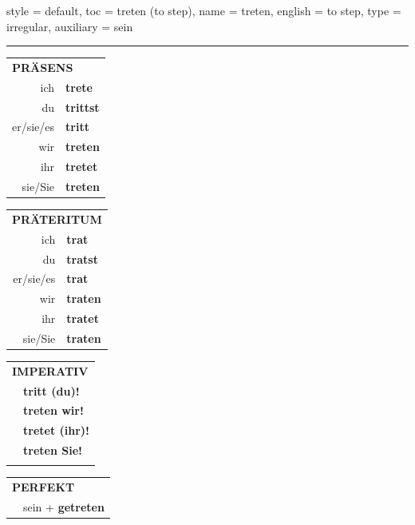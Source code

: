 \begin{verbentry}{
  style = {default},
  toc = {treten (to step)},
  name = {treten},
  english = {to step},
  type = {irregular},
  auxiliary = {sein}
}
 
    
     \vspace{5pt}

    \hrule
    
    \vspace{5pt}

  \begin{tabular}{rl}
     \multicolumn{2}{l}{\textbf{PRÄSENS} }\\
    ich & \textbf{trete}\\
    du & \textbf{trittst}\\
    er/sie/es & \textbf{tritt}\\
    wir & \textbf{treten}\\
    ihr & \textbf{tretet}\\
    sie/Sie & \textbf{treten}\\
  \end{tabular}
  \hfill
     \begin{tabular}{rl}
    \multicolumn{2}{l}{\textbf{PRÄTERITUM} }\\
    ich & \textbf{trat}\\
    du & \textbf{tratst}\\
    er/sie/es & \textbf{trat}\\
    wir & \textbf{traten}\\
    ihr & \textbf{tratet}\\
    sie/Sie & \textbf{traten}\\
  \end{tabular}
  \hfill
  \begin{tabular}{rl}
     \multicolumn{2}{l}{\textbf{IMPERATIV} }\\
   & \textbf{tritt (du)!}\\
   & \textbf{treten wir!}\\
   & \textbf{tretet (ihr)!}\\
   & \textbf{treten Sie!}\\
   & \vspace{10pt}
  \end{tabular}

    \vspace{10pt}

 \begin{tabular}{rl}
     \multicolumn{2}{l}{\textbf{PERFEKT}}\\
   & sein + \textbf{getreten}\\
  \end{tabular}
\hfill
   \begin{tabular}{rl}
   

\end{tabular}
\end{verbentry}
